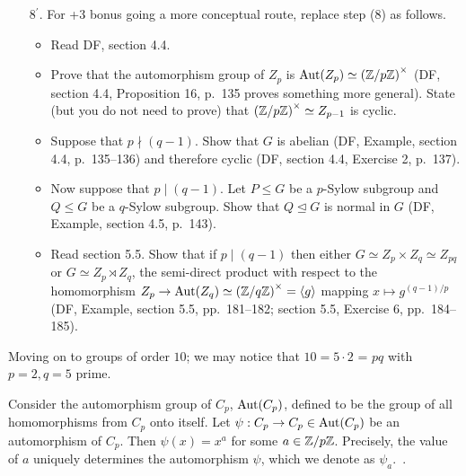\begin{Answer}
\begin{enumerate}
    \item[{8${}^\prime$.}] For +3 bonus going a more conceptual route, replace step 
    (8) as follows.
    \begin{itemize}
    \item Read DF, section 4.4.  
    \item Prove that the automorphism group of $Z_p$ is $\operatorname{Aut}(Z_p) \simeq
      {(\mathbb{Z}/p\mathbb{Z})}^\times$ (DF, section 4.4, Proposition 16, p.~135 proves something more general).  
    State (but you do not need to prove) that ${(\mathbb{Z}/p\mathbb{Z})}^\times \simeq Z_{p-1}$ is 
    cyclic.  
    \item Suppose that $p \nmid (q-1)$.  Show that $G$ is abelian (DF, Example, section
    4.4, p.~135--136)
    and therefore cyclic (DF, section 4.4, Exercise 2, p.~137).  
    \item Now suppose that $p \mid (q-1)$.  Let $P \leq G$ be a $p$-Sylow subgroup and 
    $Q \leq G$ be a $q$-Sylow subgroup.  Show that $Q \trianglelefteq G$ is normal in 
    $G$ (DF, Example, section 4.5, p.~143).
    \item Read section 5.5.  Show that if $p \mid (q-1)$ then either $G \simeq Z_p
    \times Z_q \simeq Z_{pq}$ or $G \simeq Z_p \rtimes Z_q$, the semi-direct product 
    with respect to the homomorphism $Z_p \to \operatorname{Aut}(Z_q) \simeq {(\mathbb{Z}/q\mathbb{Z})}^\times =
    \langle g \rangle$ mapping $x \mapsto g^{(q-1)/p}$ (DF, Example, section 5.5, 
    pp.~181--182; section 5.5, Exercise 6, pp.~184--185).
    \end{itemize}
  \end{enumerate}
\end{Answer}

Moving on to groups of order $10$; we may notice that $10 = 5 \cdot 2$ = $pq$
with $p=2, q=5$ prime.

Consider the automorphism group of $C_p$, $\operatorname{Aut}(C_p)$,
defined to be the group of all homomorphisms from $C_p$ onto itself.
Let $\psi : C_p \to C_p \in \operatorname{Aut}(C_p)$ be an automorphism of $C_p$.
Then $\psi(x) = x^a$ for some $a \in \mathbb{Z}/p\mathbb{Z}$.
Precisely, the value of $a$ uniquely determines the automorphism $\psi$,
which we denote as $\psi_a$.~\cite[see DF Section 4.4, Proposition $16$]{DummitFoote}.


